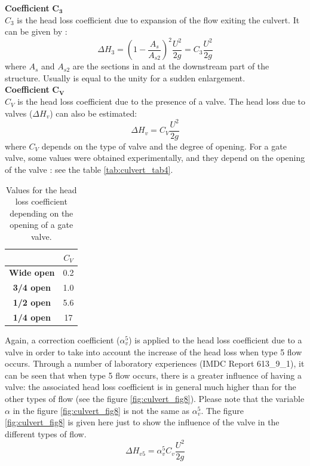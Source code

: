 \textbf{Coefficient} $\mathbf{C_3}$\\
$C_3$ is the head loss coefficient due to expansion of the flow exiting the culvert.
It can be given by \cite{Lencastre1961}:
\begin{equation}
\Delta H_3 = \left(1-\dfrac{A_s}{A_{s2}}\right)^2 \dfrac{U^2}{2g} = C_3\dfrac{U^2}{2g}
\end{equation}
where $A_s$ and $A_{s2}$ are the sections in and at the downstream part of the structure.
Usually is equal to the unity for a sudden enlargement.\\

\textbf{Coefficient} $\mathbf{C_V}$\\
$C_V$ is the head loss coefficient due to the presence of a valve.
The head loss due to valves ($\Delta H_v$) can also be estimated:
\begin{equation}
\Delta H_v = C_V\dfrac{U^2}{2g}
\end{equation}
where $C_V$ depends on the type of valve and the degree of opening.
For a gate valve, some values were obtained experimentally,
and they depend on the opening of the valve \cite{Bruce2000}:
see the table \ref{tab:culvert_tab4}.
\begin{table}[H]
\caption{Values for the head loss coefficient depending on the opening of a gate valve.}
\label{tab:culvert_tab3}
\begin{center}\begin{tabular}{|c|c|}
\hline
~ & $C_V$ \\
\hline
\textbf{Wide open} & 0.2\\
\hline
\textbf{3/4 open} & 1.0 \\
\hline
\textbf{1/2 open} & 5.6 \\
\hline
\textbf{1/4 open} & 17 \\
\hline
\end{tabular}\end{center}
\end{table}

Again, a correction coefficient ($\alpha_v^5$) is applied to the head loss coefficient
due to a valve in order to take into account the increase of the head loss when type 5
flow occurs.
Through a number of laboratory experiences (IMDC Report 613\_9\_1), it can be seen that when
type 5 flow occurs, there is a greater influence of having a valve:
the associated head loss coefficient is in general much higher than for the other types of
flow (see the figure  \ref{fig:culvert_fig8}).
Please note that the variable $\alpha$ in the figure \ref{fig:culvert_fig8}
is not the same as $\alpha_v^5$.
The figure \ref{fig:culvert_fig8} is given here just to show the influence of
the valve in the different types of flow.
\begin{equation}
\Delta H_{v5} = \alpha_v^5 C_v \dfrac{U^2}{2g}
\end{equation}

